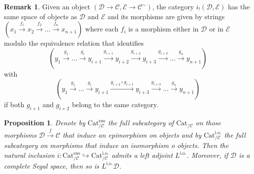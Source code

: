 \documentclass[a4paper, reqno]{amsart}
\newtheorem{prop}[theorem]{Proposition}
\theoremstyle{definition}
\newtheorem{remark}[theorem]{Remark}
\newcommand\cC{\mathscr C}
\newcommand\cD{\mathscr D}
\newcommand\cE{\mathscr E}
\newcommand\cat{\mathrm{Cat}}
\newcommand\bo{\mathrm{i.o.}}
\newcommand\eso{\mathrm{eso}}
\begin{document}
\begin{remark}\label{rem:free_cat}
Given an object $(\cD\rightarrow\cC,\cE\rightarrow\cC^\sim)$, the category $i_!(\cD,\cE)$ has the same space of objects as $\cD$ and $\cE$ and its morphisms are given by strings $(x_1\xrightarrow{f_1}x_2\xrightarrow{f_2}...\xrightarrow{f_n}x_{n+1})$ where each $f_i$ is a morphism either in $\cD$ or in $\cE$ modulo the equivalence relation that identifies \[(y_1\xrightarrow{g_1}...\xrightarrow{g_i}y_{i+1}\xrightarrow{g_{i+1}}y_{i+2}\xrightarrow{g_{i+2}}y_{i+3}\xrightarrow{g_{i+3}}...\xrightarrow{g_n}y_{n+1})\] with \[(y_1\xrightarrow{g_1}...\xrightarrow{g_i}y_{i+1}\xrightarrow{g_{i+2}\circ g_{i+1}}y_{i+3}\xrightarrow{g_{i+3}}...\xrightarrow{g_n}y_{n+1})\]
if both $g_{i+1}$ and $g_{i+2}$ belong to the same category.
\end{remark}
\begin{prop}\label{prop:bo}
Denote by $\cat^\eso_{/\cC}$ the full subcategory of $\cat_{/\cC}$ on those morphisms $\cD\xrightarrow{f}\cC$ that induce an epimorphism on objects and by $\cat^\bo_{/\cC}$ the full subcategory on morphisms that induce an isomorphism o objects. Then the natural inclusion $i:\cat^\eso_{/\cC}\hookrightarrow\cat^\bo_{/\cC}$ admits a left adjoint $L^\bo$. Moreover, if $\cD$ is a complete Segal space, then so is $L^\bo\cD$.
\end{prop}
\end{document}
